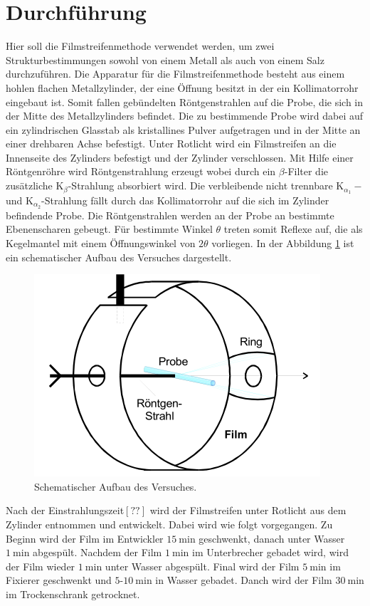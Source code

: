 \section{Durchführung}
\label{sec:Durchführung}
Hier soll die Filmstreifenmethode verwendet werden,
um zwei Strukturbestimmungen
sowohl von einem Metall als auch von
einem Salz durchzuführen.
Die Apparatur für die Filmstreifenmethode
besteht aus einem hohlen flachen Metallzylinder,
der eine Öffnung besitzt
in der ein Kollimatorrohr eingebaut ist.
Somit fallen gebündelten Röntgenstrahlen auf
 die Probe, die sich in
der Mitte des Metallzylinders befindet.
Die zu bestimmende Probe wird dabei auf ein
zylindrischen Glasstab
als kristallines Pulver aufgetragen und in der Mitte an einer drehbaren
Achse befestigt. Unter Rotlicht wird ein Filmstreifen an die Innenseite
des Zylinders befestigt und der Zylinder verschlossen.
Mit Hilfe einer Röntgenröhre wird Röntgenstrahlung erzeugt
wobei durch ein $\beta$-Filter die zusätzliche
$\mathrm{K}_\beta$-Strahlung absorbiert wird.
Die verbleibende nicht trennbare  $\mathrm{K}_{\alpha_1}-$
und $\mathrm{K}_{\alpha_2}$-Strahlung fällt durch das Kollimatorrohr
auf die sich im Zylinder befindende Probe. Die Röntgenstrahlen werden an
der Probe an bestimmte Ebenenscharen gebeugt. Für bestimmte Winkel $\theta$ treten
somit Reflexe auf, die als Kegelmantel mit einem Öffnungswinkel von $2\theta$
vorliegen. In der Abbildung \ref{fig:aufbau} ist ein schematischer Aufbau des Versuches dargestellt.
\begin{figure}
  \centering
  \includegraphics{Aufbau.PNG}
  \caption{Schematischer Aufbau des Versuches.}
  \label{fig:aufbau}
 \end{figure}
Nach der Einstrahlungszeit$[??]$ wird der Filmstreifen unter Rotlicht
aus dem Zylinder entnommen und entwickelt.
Dabei wird wie folgt vorgegangen.
Zu Beginn wird der Film im Entwickler $\SI{15}{\minute}$ geschwenkt,
danach unter Wasser $\SI{1}{\minute}$ abgespült.
Nachdem der Film $\SI{1}{\minute}$ im Unterbrecher gebadet wird, wird
der Film wieder $\SI{1}{\minute}$ unter Wasser abgespült.
Final wird der Film $\SI{5}{\minute}$ im Fixierer geschwenkt und
$5$-$\SI{10}{\minute}$ in Wasser gebadet.
Danch wird der Film $\SI{30}{\minute}$ im Trockenschrank getrocknet.


